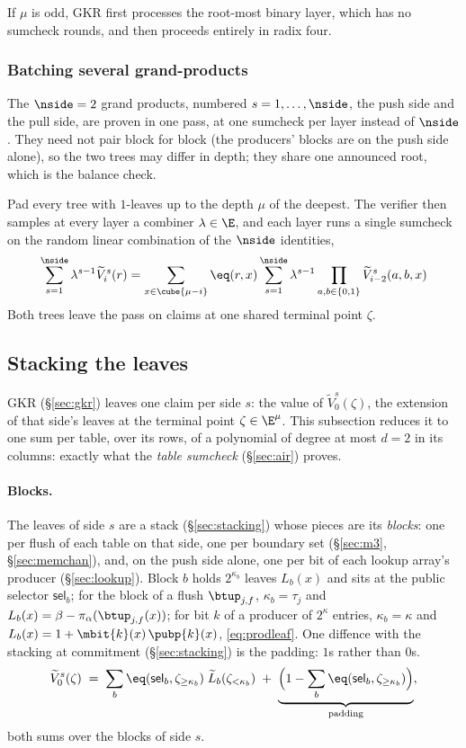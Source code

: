 If $\mu$ is odd, GKR first processes the root-most binary layer, which has no sumcheck rounds, and then proceeds entirely in radix four.

\subsubsection{Batching several grand-products}

The $\nside=2$ grand products, numbered $s=1,\dots,\nside$, the push side and the pull side, are proven in one pass, at one sumcheck per layer instead of $\nside$. They need not pair block for block (the producers' blocks are on the push side alone), so the two trees may differ in depth; they share one announced root, which is the balance check.

Pad every tree with $1$-leaves up to the depth $\mu$ of the deepest. The verifier then samples at every layer a combiner $\lambda \in \E$, and each layer runs a single sumcheck on the random linear combination of the $\nside$ identities,
\[
\sum_{s=1}^{\nside}\lambda^{s-1}\widetilde V_i^{s}(r)=\sum_{x\in\cube{\mu-i}}\eq(r,x)\sum_{s=1}^{\nside}\lambda^{s-1}\prod_{a,b\in\{0,1\}}\widetilde V_{i-2}^{s}(a,b,x)
\]
Both trees leave the pass on claims at one shared terminal point $\zeta$.

\subsection{Stacking the leaves}\label{sec:leafstack}

GKR (\S\ref{sec:gkr}) leaves one claim per side $s$: the value of $\widetilde V^{s}_0(\zeta)$, the extension of that side's leaves at the terminal point $\zeta\in\E^{\mu}$. This subsection reduces it to one sum per table, over its rows, of a polynomial of degree at most $d=2$ in its columns: exactly what the \emph{table sumcheck} (\S\ref{sec:air}) proves.

\paragraph{Blocks.} The leaves of side $s$ are a stack (\S\ref{sec:stacking}) whose pieces are its \emph{blocks}: one per flush of each table on that side, one per boundary set (\S\ref{sec:m3}, \S\ref{sec:memchan}), and, on the push side alone, one per bit of each lookup array's producer (\S\ref{sec:lookup}). Block $b$ holds $2^{\kappa_b}$ leaves $L_b(x)$ and sits at the public selector $\mathsf{sel}_b$; for the block of a flush $\btup_{j,f}$, $\kappa_b=\tau_j$ and $L_b(x)=\beta-\pi_\alpha(\btup_{j,f}(x))$; for bit $k$ of a producer of $2^{\kappa}$ entries, $\kappa_b=\kappa$ and $L_b(x)=1+\mbit{k}(x)\,\pubp{k}(x)$, \eqref{eq:prodleaf}. One diffence with the stacking at commitment (\S\ref{sec:stacking}) is the padding: $1$s rather than $0$s.
\begin{equation}\label{eq:gkr_leaves}
  \widetilde V^{s}_0(\zeta)\;=\;\sum_{b}\eq(\mathsf{sel}_b,\zeta_{\ge\kappa_b})\;\widetilde L_b(\zeta_{<\kappa_b})\;+\;\underbrace{\Bigl(1-\sum_{b}\eq(\mathsf{sel}_b,\zeta_{\ge\kappa_b})\Bigr)}_{\text{padding}},
\end{equation}
both sums over the blocks of side $s$.

